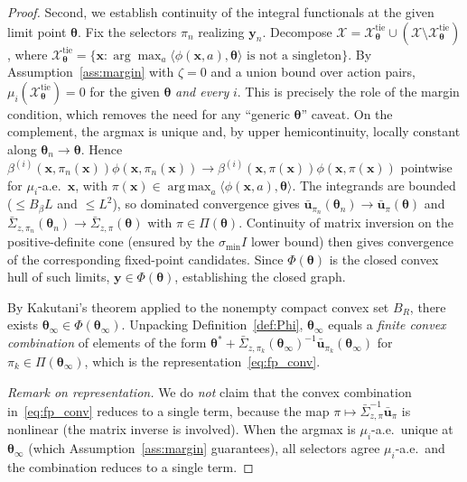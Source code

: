 \documentclass[11pt]{article}
\DeclareMathOperator*{\argmax}{arg\,max}
\begin{document}
\begin{proof}
Second, we establish continuity of the integral functionals at the
given limit point $\bm{\theta}$.  Fix the selectors $\pi_n$ realizing
$\bm{y}_n$.  Decompose
$\mathcal{X}=\mathcal{X}^{\mathrm{tie}}_{\bm{\theta}}\cup
(\mathcal{X}\setminus\mathcal{X}^{\mathrm{tie}}_{\bm{\theta}})$, where
$\mathcal{X}^{\mathrm{tie}}_{\bm{\theta}}=\{\bm{x}:
\arg\max_a\langle\phi(\bm{x},a),\bm{\theta}\rangle
\text{ is not a singleton}\}$.
By Assumption~\ref{ass:margin} with $\zeta=0$ and a union bound over
action pairs, $\mu_i(\mathcal{X}^{\mathrm{tie}}_{\bm{\theta}})=0$ for
the given $\bm{\theta}$ \emph{and every} $i$. This is precisely the
role of the margin condition, which removes the need for any ``generic
$\bm{\theta}$'' caveat.  On the complement, the argmax is unique and,
by upper hemicontinuity, locally constant along
$\bm{\theta}_n\to\bm{\theta}$. Hence $\beta^{(i)}(\bm{x},\pi_n(\bm{x}))\phi(\bm{x},\pi_n(\bm{x}))\to
\beta^{(i)}(\bm{x},\pi(\bm{x}))\phi(\bm{x},\pi(\bm{x}))$ pointwise for
$\mu_i$-a.e.\ $\bm{x}$, with $\pi(\bm{x})\in\argmax_a\langle\phi(\bm{x},a),
\bm{\theta}\rangle$.  The integrands are bounded ($\leq B_\beta L$ and
$\leq L^2$), so dominated convergence gives
$\bar{\bm{u}}_{\pi_n}(\bm{\theta}_n)\to\bar{\bm{u}}_\pi(\bm{\theta})$
and
$\bar{\Sigma}_{z,\pi_n}(\bm{\theta}_n)\to\bar{\Sigma}_{z,\pi}(\bm{\theta})$
with $\pi\in\Pi(\bm{\theta})$.
Continuity of matrix inversion on the positive-definite cone
(ensured by the $\sigma_{\min}I$ lower bound) then gives
convergence of the corresponding fixed-point candidates.
Since $\Phi(\bm{\theta})$ is the closed convex hull of such limits,
$\bm{y}\in\Phi(\bm{\theta})$, establishing the closed graph.

By Kakutani's theorem applied to the nonempty compact convex set $B_R$,
there exists $\bm{\theta}_\infty\in\Phi(\bm{\theta}_\infty)$.
Unpacking Definition~\ref{def:Phi}, $\bm{\theta}_\infty$ equals a
\emph{finite convex combination} of elements of the form
$\bm{\theta}^{\!*}+\bar{\Sigma}_{z,\pi_k}(\bm{\theta}_\infty)^{-1}
\bar{\bm{u}}_{\pi_k}(\bm{\theta}_\infty)$
for $\pi_k\in\Pi(\bm{\theta}_\infty)$,
which is the representation~\eqref{eq:fp_conv}.

\emph{Remark on representation.}
We do \emph{not} claim that the convex combination in~\eqref{eq:fp_conv}
reduces to a single term, because the map
$\pi\mapsto\bar{\Sigma}_{z,\pi}^{-1}\bar{\bm{u}}_\pi$ is nonlinear
(the matrix inverse is involved).  When the argmax is $\mu_i$-a.e.\
unique at $\bm{\theta}_\infty$ (which Assumption~\ref{ass:margin}
guarantees), all selectors agree
$\mu_i$-a.e.\ and the combination reduces to a single term.
\end{proof}
\end{document}
